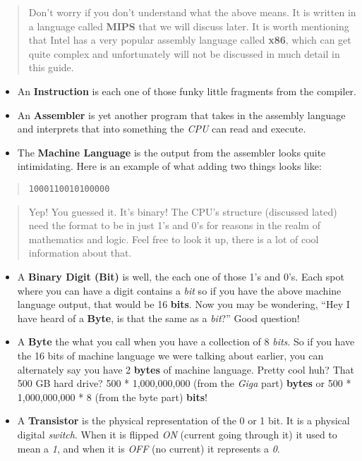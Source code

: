 \documentclass[landscape]{article}
\begin{document}
\begin{multicols}{3}
\begin{quote}
Don't worry if you don't understand what the above means. It is written
in a language called \textbf{MIPS} that we will discuss later. It is
worth mentioning that Intel has a very popular assembly language called
\textbf{x86}, which can get quite complex and unfortunately will not be
discussed in much detail in this guide.
\end{quote}

\begin{itemize}
\item
  An \textbf{Instruction} is each one of those funky little fragments
  from the compiler.
\item
  An \textbf{Assembler} is yet another program that takes in the
  assembly language and interprets that into something the \emph{CPU}
  can read and execute.
\item
  The \textbf{Machine Language} is the output from the assembler looks
  quite intimidating. Here is an example of what adding two things looks
  like:
\end{itemize}

\begin{quote}
\texttt{1000110010100000}
\end{quote}

\begin{quote}
Yep! You guessed it. It's binary! The CPU's structure (discussed lated)
need the format to be in just 1's and 0's for reasons in the realm of
mathematics and logic. Feel free to look it up, there is a lot of cool
information about that.
\end{quote}

\begin{itemize}
\item
  A \textbf{Binary Digit (Bit)} is well, the each one of those 1's and
  0's. Each spot where you can have a digit contains a \emph{bit} so if
  you have the above machine language output, that would be 16
  \textbf{bits}. Now you may be wondering, ``Hey I have heard of a
  \textbf{Byte}, is that the same as a \emph{bit}?'' Good question!
\item
  A \textbf{Byte} the what you call when you have a collection of 8
  \emph{bits}. So if you have the 16 bits of machine language we were
  talking about earlier, you can alternately say you have 2
  \textbf{bytes} of machine language. Pretty cool huh? That 500 GB hard
  drive? 500 * 1,000,000,000 (from the \emph{Giga} part) \textbf{bytes}
  or 500 * 1,000,000,000 * 8 (from the byte part) \textbf{bits}!
\item
  A \textbf{Transistor} is the physical representation of the 0 or 1
  bit. It is a physical digital \emph{switch}. When it is flipped
  \emph{ON} (current going through it) it used to mean a \emph{1}, and
  when it is \emph{OFF} (no current) it represents a \emph{0}.
\end{itemize}


\end{multicols}
\end{document}
